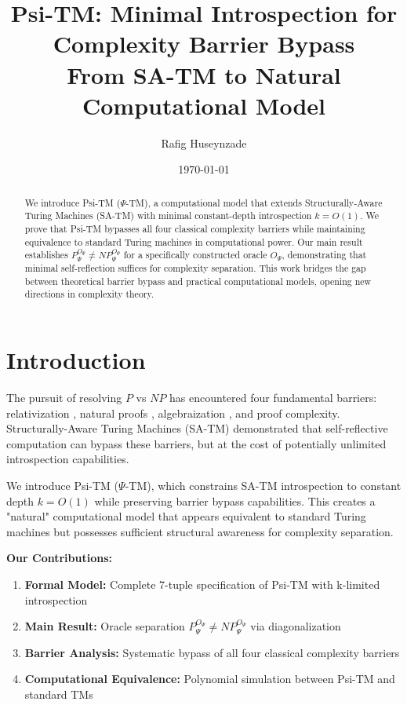 \documentclass[11pt]{article}
\title{Psi-TM: Minimal Introspection for Complexity Barrier Bypass\\
\large{From SA-TM to Natural Computational Model}}
\author{Rafig Huseynzade}
\date{\today}
\begin{document}
\maketitle

\begin{abstract}
We introduce Psi-TM ($\Psi$-TM), a computational model that extends Structurally-Aware Turing Machines (SA-TM) with minimal constant-depth introspection $k = O(1)$. We prove that Psi-TM bypasses all four classical complexity barriers while maintaining equivalence to standard Turing machines in computational power. Our main result establishes $P^{O_\Psi}_\Psi \neq NP^{O_\Psi}_\Psi$ for a specifically constructed oracle $O_\Psi$, demonstrating that minimal self-reflection suffices for complexity separation. This work bridges the gap between theoretical barrier bypass and practical computational models, opening new directions in complexity theory.
\end{abstract}

\section{Introduction}

The pursuit of resolving $P$ vs $NP$ has encountered four fundamental barriers: relativization \cite{BGS75}, natural proofs \cite{RR97}, algebraization \cite{AW09}, and proof complexity. Structurally-Aware Turing Machines (SA-TM) \cite{SA-TM} demonstrated that self-reflective computation can bypass these barriers, but at the cost of potentially unlimited introspection capabilities.

We introduce Psi-TM ($\Psi$-TM), which constrains SA-TM introspection to constant depth $k = O(1)$ while preserving barrier bypass capabilities. This creates a "natural" computational model that appears equivalent to standard Turing machines but possesses sufficient structural awareness for complexity separation.

\textbf{Our Contributions:}
\begin{enumerate}
\item \textbf{Formal Model:} Complete 7-tuple specification of Psi-TM with k-limited introspection
\item \textbf{Main Result:} Oracle separation $P^{O_\Psi}_\Psi \neq NP^{O_\Psi}_\Psi$ via diagonalization
\item \textbf{Barrier Analysis:} Systematic bypass of all four classical complexity barriers
\item \textbf{Computational Equivalence:} Polynomial simulation between Psi-TM and standard TMs
\end{enumerate}
\end{document}
